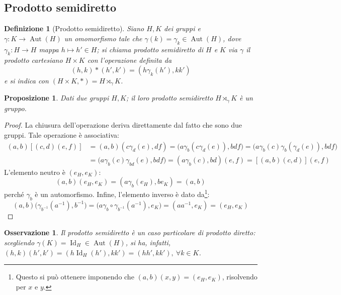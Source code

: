 \documentclass[11pt]{article}
\theoremstyle{style}
\newtheorem{definizione}{Definizione}[section]
\newtheorem{prop}{Proposizione}[section]
\newtheorem{osservazione}{Osservazione}[section]
\numberwithin{equation}{subsection}
\begin{document}
\subsection{Prodotto semidiretto}
\begin{definizione}
	[Prodotto semidiretto]
	Siano $H ,K$ dei gruppi e $\gamma : K \to \operatorname{Aut} (H)$ un omomorfismo tale che $\gamma(k)=\gamma_k \in \operatorname{Aut} (H)$, dove $\gamma_k : H\to H$ mappa $h\mapsto h' \in H$; si chiama \textit{prodotto semidiretto} di $H$ e $K$ via $\gamma$ il prodotto cartesiano $H\times K$ con l'operazione definita da
	\[
		(h,k) * (h',k') = (h \gamma_k(h'), kk')
	\] 
	e si indica con $(H\times K, *) = H\rtimes _\gamma K$.
\end{definizione}
\begin{prop}
	Dati due gruppi $H,K$; il loro prodotto semidiretto $H \rtimes _\gamma K$ \`e un gruppo.
\end{prop}
	\begin{proof}
		La chiusura dell'operazione deriva direttamente dal fatto che sono due gruppi.
		Tale operazione \`e associativa:
		\[
			\begin{split}
				(a,b)\left[ (c,d)(e,f) \right] &=(a,b)(c\gamma_d(e),df) = \big(a \gamma_b(c\gamma_d(e)),bdf\big)= \big(a\gamma_b(c) \gamma_b(\gamma_d(e)),bdf\big)\\
				&=\big(a \gamma_b(c) \gamma_{bd} (e),bdf\big) = (a\gamma_b(c), bd)(e,f) = \left[ (a,b)(c,d) \right] (e,f)
			\end{split}
		\] 
	L'elemento neutro \`e $(e_H,e_K)$:	
\[
	(a,b) (e_H,e_K) = (a \gamma_b(e_H) , be_K) = (a,b)
\] 
perch\'e $\gamma_b$ \`e un automorfismo.
Infine, l'elemento inverso \`e dato da\footnote{Questo si pu\`o ottenere imponendo che $(a,b)(x,y) = (e_H,e_K)$, risolvendo per $x$ e $y$.}:
\[
(a,b) \big(\gamma_{b^{-1}} (a^{-1}), b^{-1}\big) = \big(a \gamma_{b} \circ \gamma_{b^{-1}}(a^{-1}) , e_K \big)=(a a^{-1},e_K) = (e_H,e_K)
\] 
	\end{proof}
\begin{osservazione}
Il prodotto semidiretto \`e un caso particolare di prodotto diretto: scegliendo $\gamma(K) = \operatorname{Id} _H \in \operatorname{Aut} (H)$, si ha, infatti, $(h,k)(h',k') = (h\operatorname{Id}_H(h'),kk') = (hh',k k'), \ \forall k \in K$.
\end{osservazione}
\end{document}
